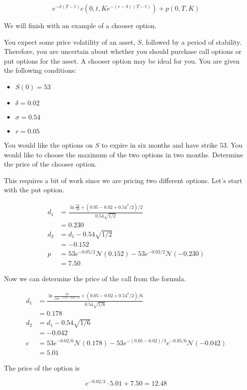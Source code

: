 \documentclass{ximera}
\begin{document}
\begin{equation*}
e^{-\delta(T-t)}c(0,t,Ke^{-(r-\delta)(T-t)})+p(0,T,K)
\end{equation*}

We will finish with an example of a chooser option.

\begin{example}
You expect some price volatility of an asset, $S$, followed by a period of stability. Therefore, you are uncertain about whether you should purchase call options or put options for the asset. A chooser option may be ideal for you. You are given the following conditions:

	\begin{itemize}
	\item $S(0)=53$\\
	\item $\delta=0.02$\\
	\item $\sigma=0.54$\\
	\item $r=0.05$
	\end{itemize}

You would like the options on $S$ to expire in six months and have strike $53$. You would like to choose the maximum of the two options in two months. Determine the price of the chooser option.
\end{example}

\begin{solution}
This requires a bit of work since we are pricing two different options. Let's start with the put option.

	\begin{align*}
	d_1 		&=\frac{\ln\frac{53}{53}+(0.05-0.02+0.54^2/2)/2}{0.54\sqrt{1/2}}\\
			&=0.230\\
	d_2		&=d_1-0.54\sqrt{1/2}\\
			&=-0.152\\
	p 		&=53e^{-0.05/2}\mathcal{N}(0.152)-53e^{-0.02/2}\mathcal{N}(-0.230)\\
			&=7.50
	\end{align*}

Now we can determine the price of the call from the formula.

	\begin{align*}
	d_1 		&=\frac{\ln\frac{53}{53e^{-(0.05-0.02)/3}}+(0.05-0.02+0.54^2/2)/6}{0.54\sqrt{1/6}}\\
			&=0.178\\
	d_2 		&=d_1-0.54\sqrt{1/6}\\
			&=-0.042\\
	c 		&=53e^{-0.02/6}\mathcal{N}(0.178)-53e^{-(0.05-0.02)/3}e^{-0.05/6}\mathcal{N}(-0.042)\\
			&=5.01
	\end{align*}

The price of the option is

	\begin{equation*}
	e^{-0.02/3}\cdot 5.01+7.50=12.48
	\end{equation*}
\end{solution}
\end{document}
